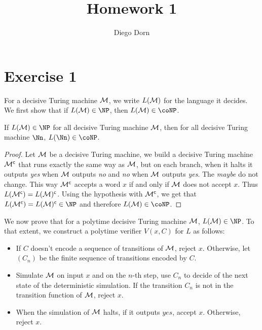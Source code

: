 


\title{Homework 1}
\author{Diego Dorn}


    \maketitle


    \section*{Exercise 1}

    For a decisive Turing machine $\mathcal{M}$, we write $L(\mathcal{M})$ for the language it decides.
    We first show that if $L(\Mm) \in \NP$, then $L(\Mm) \in \coNP$.

    \begin{claim}
        If 
        $L(\Mm) \in \NP$ 
        for all decisive Turing machine $\mathcal{M}$, 
        then for all decisive Turing machine $\Nn$,
        $L(\Nn) \in \coNP$.
    \end{claim}

    \begin{proof}
        Let $\mathcal{M}$ be a decisive Turing machine,
        we build a decisive Turing machine $\mathcal{M}^\mathsf{c}$
        that runs exactly the same way as $\mathcal{M}$, but on each branch,
        when it halts it outputs \textit{yes} when $\mathcal{M}$ outputs \textit{no}
        and \textit{no} when $\mathcal{M}$ outputs \textit{yes}. The \textit{maybe} 
        do not change. This way $\mathcal{M}^\mathsf{c}$ accepts a word $x$ if and only
        if $\mathcal{M}$ does not accept $x$. 
        Thus $L(\mathcal{M}^\mathsf{c}) = L(\mathcal{M})^\mathsf{c}$.
        Using the hypothesis with $\mathcal{M}^\mathsf{c}$, 
        we get that $L(\compl{\Mm}) = \compl{L(\Mm)} \in \NP$
        and therefore $L(\Mm) \in \coNP$.
    \end{proof}

    We now prove that for a polytime decisive Turing machine $\mathcal{M}$, 
    $L(\Mm) \in \NP$.
    To that extent, we construct a polytime verifier $V(x, C)$ for $L$
    as follows:
    \begin{itemize}
        \item If $C$ doesn't encode a sequence of transitions of $\mathcal{M}$, reject $x$. 
            Otherwise, let $(C_n)$ be the finite sequence of transitions encoded by $C$.
        \item Simulate $\mathcal{M}$ on input $x$ and on the $n$-th step, use $C_n$ to decide 
            of the next state of the deterministic simulation. 
            If the transition $C_n$ is not in the transition function of $\mathcal{M}$, reject $x$.
        \item When the simulation of $\mathcal{M}$ halts, if it outputs $yes$, 
            accept $x$. Otherwise, reject $x$.
    \end{itemize}

